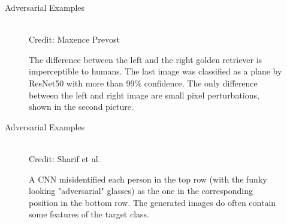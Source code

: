  \begin{frame} {Adversarial Examples}
  \begin{figure}
    \centering
       \captionsetup{font=footnotesize,labelfont=footnotesize, labelfont = bf}
      \tiny{\\Credit: Maxence Prevost}
      \caption{\footnotesize The difference between the left and the right golden retriever is imperceptible to humans.
      The last image was classified as a plane by ResNet50 with more than 99\% confidence. 
      The only difference between the left and right image are small pixel perturbations, shown in the second picture.}
  \end{figure}
\end{frame}

\begin{frame} {Adversarial Examples}
  \begin{figure}
    \centering
       \captionsetup{font=footnotesize,labelfont=footnotesize, labelfont = bf}
      \tiny{\\Credit: Sharif et al.}
      \caption{\footnotesize A CNN misidentified each person in the top row (with the funky looking "adversarial" glasses) as the one in the corresponding position in the bottom row. The generated images do often contain some features of the target class.}
  \end{figure}
\end{frame}


